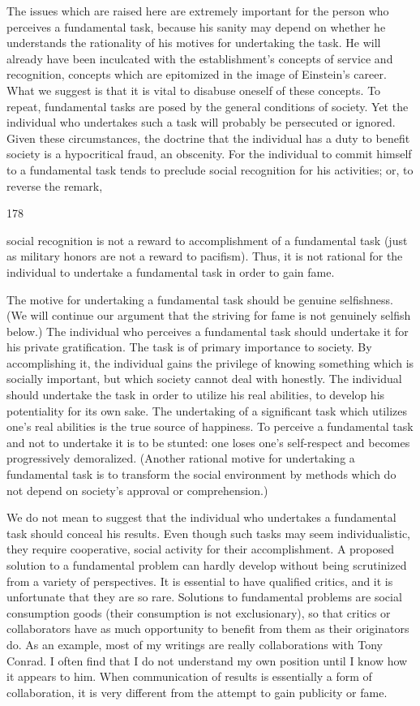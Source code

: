 \documentclass[10pt,twoside]{memoir}
\begin{document}
\begin{enumerate}
{{The issues which are raised here are extremely important for the person 
who perceives a fundamental task, because his sanity may depend on 
whether he understands the rationality of his motives for undertaking the 
task. He will already have been inculcated with the establishment's concepts 
of service and recognition, concepts which are epitomized in the image of 
Einstein's career. What we suggest is that it is vital to disabuse oneself of 
these concepts. To repeat, fundamental tasks are posed by the general 
conditions of society. Yet the individual who undertakes such a task will 
probably be persecuted or ignored. Given these circumstances, the doctrine 
that the individual has a duty to benefit society is a hypocritical fraud, an 
obscenity. For the individual to commit himself to a fundamental task tends 
to preclude social recognition for his activities; or, to reverse the remark, 


178 


social recognition is not a reward to accomplishment of a fundamental task 
(just as military honors are not a reward to pacifism). Thus, it is not rational 
for the individual to undertake a fundamental task in order to gain fame. 

The motive for undertaking a fundamental task should be genuine 
selfishness. (We will continue our argument that the striving for fame is not 
genuinely selfish below.) The individual who perceives a fundamental task 
should undertake it for his private gratification. The task is of primary 
importance to society. By accomplishing it, the individual gains the privilege 
of knowing something which is socially important, but which society cannot 
deal with honestly. The individual should undertake the task in order to 
utilize his real abilities, to develop his potentiality for its own sake. The 
undertaking of a significant task which utilizes one's real abilities is the true 
source of happiness. To perceive a fundamental task and not to undertake it 
is to be stunted: one loses one's self-respect and becomes progressively 
demoralized. (Another rational motive for undertaking a fundamental task is 
to transform the social environment by methods which do not depend on 
society's approval or comprehension.) 

We do not mean to suggest that the individual who undertakes a 
fundamental task should conceal his results. Even though such tasks may 
seem individualistic, they require cooperative, social activity for their 
accomplishment. A proposed solution to a fundamental problem can hardly 
develop without being scrutinized from a variety of perspectives. It is 
essential to have qualified critics, and it is unfortunate that they are so rare. 
Solutions to fundamental problems are social consumption goods (their 
consumption is not exclusionary), so that critics or collaborators have as 
much opportunity to benefit from them as their originators do. As an 
example, most of my writings are really collaborations with Tony Conrad. I 
often find that I do not understand my own position until I know how it 
appears to him. When communication of results is essentially a form of 
collaboration, it is very different from the attempt to gain publicity or fame. 

}}
\end{enumerate}
\end{document}
